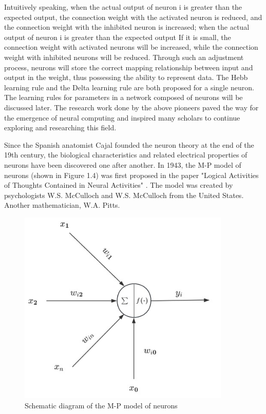 \documentclass[paper=a4, fontsize=11pt]{scrartcl} %
\numberwithin{equation}{section} %
\numberwithin{figure}{section} %
\numberwithin{table}{section} %
\begin{document}
Intuitively speaking, when the actual output of neuron i is greater than the expected output, the connection weight with the activated neuron is reduced, and the connection weight with the inhibited neuron is increased; when the actual output of neuron i is greater than the expected output If it is small, the connection weight with activated neurons will be increased, while the connection weight with inhibited neurons will be reduced. Through such an adjustment process, neurons will store the correct mapping relationship between input and output in the weight, thus possessing the ability to represent data. The Hebb learning rule and the Delta learning rule are both proposed for a single neuron. The learning rules for parameters in a network composed of neurons will be discussed later. The research work done by the above pioneers paved the way for the emergence of neural computing and inspired many scholars to continue exploring and researching this field.


Since the Spanish anatomist Cajal founded the neuron theory at the end of the 19th century, the biological characteristics and related electrical properties of neurons have been discovered one after another. In 1943, the M-P model of neurons (shown in Figure 1.4) was first proposed in the paper "Logical Activities of Thoughts Contained in Neural Activities" \cite{Mcculloch1854LOGICALCALCULUSIDEAS}. The model was created by psychologists W.S. McCulloch and W.S. McCulloch from the United States. Another mathematician, W.A. Pitts.

\begin{figure}[H]
    \centering
    \includegraphics[width=0.9\textwidth]{./data/M-P.jpg}
    \caption{Schematic diagram of the M-P model of neurons}
    \label{fig:my_picture}
    \vspace{1pt} %
\end{figure}
\end{document}
